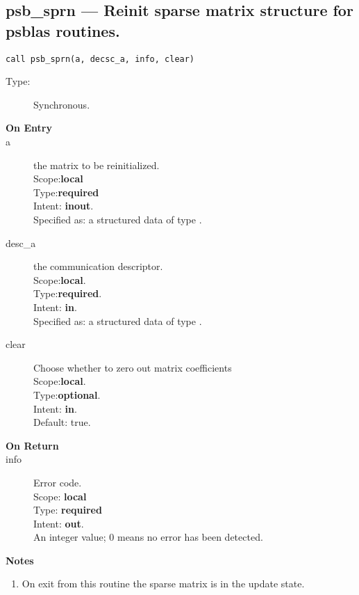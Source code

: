 %
%
\clearpage\subsection*{psb\_sprn --- Reinit sparse matrix structure for psblas
  routines.}

\begin{verbatim}
call psb_sprn(a, decsc_a, info, clear)
\end{verbatim}

\begin{description}
\item[Type:] Synchronous.
\item[\bf On Entry]
\item[a] the matrix to be reinitialized.\\
Scope:{\bf local}\\
Type:{\bf required}\\
Intent: {\bf inout}.\\
Specified as: a structured data of type \spdata.
\item[desc\_a] the communication descriptor.\\
Scope:{\bf local}.\\
Type:{\bf required}.\\
Intent: {\bf in}.\\
Specified as: a structured data of type \descdata.
\item[clear] Choose whether to zero out matrix coefficients\\
Scope:{\bf local}.\\
Type:{\bf optional}.\\
Intent: {\bf in}.\\
Default: true.
\end{description}

\begin{description}
\item[\bf On Return]
\item[info] Error code.\\
Scope: {\bf local} \\
Type: {\bf required} \\
Intent: {\bf out}.\\
An integer value; 0 means no error has been detected. 
\end{description}
{\par\noindent\large\bfseries Notes}
\begin{enumerate}
\item On exit from this routine the sparse matrix is in the update
  state. 
\end{enumerate}
%
%

